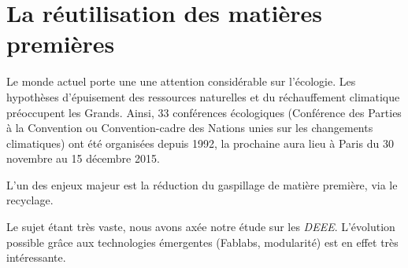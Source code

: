 \section{La réutilisation des matières premières}
Le monde actuel porte une une attention considérable sur l'écologie. Les hypothèses d'épuisement des ressources naturelles et du réchauffement climatique préoccupent les Grands. Ainsi, 33 conférences écologiques (Conférence des Parties à la Convention ou Convention-cadre des Nations unies sur les changements climatiques) ont été organisées depuis 1992, la prochaine aura lieu à Paris du  30 novembre au 15 décembre 2015. 

L'un des enjeux majeur est la réduction du gaspillage de matière première, via le recyclage. 

Le sujet étant très vaste, nous avons axée notre étude sur les \textit{DEEE}. L'évolution possible grâce aux technologies  émergentes (Fablabs, modularité) est en effet très intéressante. 